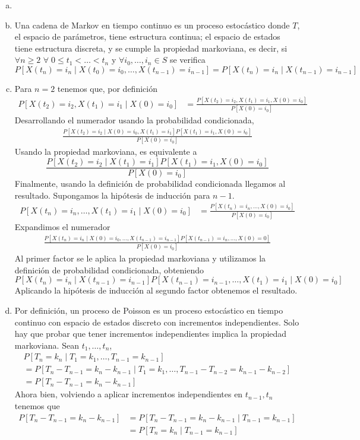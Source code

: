 \documentclass[twoside]{article}
\begin{document}
\begin{solucion}
\begin{enumerate}[a)]
\item[]
\item Una cadena de Markov en tiempo continuo es un proceso estocástico donde $T$, el espacio de parámetros, tiene estructura continua; el espacio de estados tiene estructura discreta, y se cumple la propiedad markoviana, es decir, si $\forall n \geq 2$ $\forall \;0\leq t_1 < \dotsc < t_n$ y $\forall i_0,\dotsc,i_n\in S$ se verifica
$$
P[X(t_n) = i_n \mid X(t_0)=i_0,\dotsc,X(t_{n-1})=i_{n-1}] = P[X(t_n) = i_n \mid X(t_{n-1}) = i_{n-1}]
$$
\item Para $n=2$ tenemos que, por definición
\begin{align*}
P[X(t_2)=i_2,X(t_1)=i_1\mid X(0)=i_0] &= \frac{P[X(t_2)=i_2,X(t_1)=i_1,X(0)=i_0]}{P[X(0)=i_0]}
\end{align*}
Desarrollando el numerador usando la probabilidad condicionada,
\begin{align*}
\frac{P[X(t_2)=i_2\mid X(0)=i_0,X(t_1)=i_1]P[X(t_1)=i_1,X(0)=i_0]}{P[X(0)=i_0]}
\end{align*}
Usando la propiedad markoviana, es equivalente a
$$
\frac{P[X(t_2)=i_2 \mid X(t_1)=i_1]P[X(t_1)=i_1,X(0)=i_0]}{P[X(0)=i_0]}
$$
Finalmente, usando la definición de probabilidad condicionada llegamos al resultado. Supongamos la hipótesis de inducción para $n-1$.
\begin{align*}
P[X(t_n)=i_n,\dotsc,X(t_1)=i_1 \mid X(0)=i_0] &= \frac{P[X(t_n)=i_n,\dotsc, X(0)=i_0]}{P[X(0)=i_0]}
\end{align*}
Expandimos el numerador
\begin{align*}\frac{P[X(t_n)=i_n \mid X(0)=i_0,\dotsc,X(t_{n-1})=i_{n-1}]P[X(t_{n-1})=i_n,\dotsc,X(0)=0]}{P[X(0)=i_0]}
\end{align*}
Al primer factor se le aplica la propiedad markoviana y utilizamos la definición de probabilidad condicionada, obteniendo
$$
P[X(t_n)=i_n\mid X(t_{n-1})=i_{n-1}]P[X(t_{n-1})=i_{n-1},\dotsc,X(t_1)=i_1\mid X(0)=i_0]
$$
Aplicando la hipótesis de inducción al segundo factor obtenemos el resultado.
\item Por definición, un proceso de Poisson es un proceso estocástico en tiempo continuo con espacio de estados discreto con incrementos independientes. Solo hay que probar que tener incrementos independientes implica la propiedad markoviana.
Sean $t_1,\dotsc,t_n$, 
\begin{gather*}
P[T_n =  k_n \mid T_1=k_1,\dotsc,T_{n-1}=k_{n-1}] \\= P[T_n -T_{n-1} =  k_n - k_{n-1}\mid T_1=k_1,\dotsc,T_{n-1}-T_{n-2}=k_{n-1}-k_{n-2}]\\
=P[T_n-T_{n-1}=k_n - k_{n-1}]
\end{gather*}
Ahora bien, volviendo a aplicar incrementos independientes en $t_{n-1},t_n$ tenemos que 
\begin{align*}
P[T_n-T_{n-1}=k_n - k_{n-1}] &= P[T_n -T_{n-1} =k_n - k_{n-1}\mid T_{n-1}  = k_{n-1}]\\
&= P[T_n =k_n \mid T_{n-1} =k_{n-1}]
\end{align*}
\end{enumerate}
\end{solucion}
\newpage
\end{document}
